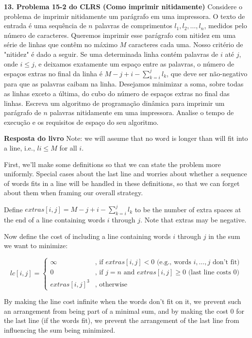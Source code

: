 
\noindent \textbf{13. Problema 15-2 do CLRS (Como imprimir nitidamente)} Considere o problema de imprimir nitidamente um parágrafo em uma impressora. O texto de entrada é uma sequência de $n$ palavras de comprimentos $l_1, l_2, \ldots, l_n$, medidos pelo número de caracteres. Queremos imprimir esse parágrafo com nitidez em uma série de linhas que contêm no máximo $M$ caracteres cada uma. Nosso critério de "nitidez" é dado a seguir. Se uma determinada linha contém palavras de $i$ até $j$, onde $i \leq j$, e deixamos exatamente um espaço entre as palavras, o número de espaços extras no final da linha é $M - j + i - \sum_{k=i}^j l_k$, que deve ser não-negativo para que as palavras caibam na linha. Desejamos minimizar a soma, sobre todas as linhas exceto a última, do cubo do número de espaços extras no final das linhas. Escreva um algoritmo de programação dinâmica para imprimir um parágrafo de $n$ palavras nitidamente em uma impressora. Analise o tempo de execução e os requisitos de espaço do seu algoritmo.

\textbf{Resposta do livro} Note: we will assume that no word is longer than will fit into a line, i.e., $li \leq M$ for all $i$.

First, we'll make some definitions so that we can state the problem more uniformly. Special cases about the last line and worries about whether a sequence of words fits in a line will be handled in these definitions, so that we can forget about them when framing our overall strategy.

Define $extras[i, j] = M - j + i - \sum_{k=i}^j l_k$ to be the number of extra spaces at the end of a line containing words $i$ through $j$. Note that extras may be negative.

Now define the cost of including a line containing words $i$ through $j$ in the sum we want to minimize:

\begin{equation*}
    lc[i, j] =
    \begin{cases}
        \infty & \text{, if } extras[i, j] < 0 \text{ (e.g., words $i, \ldots, j$ don't fit)} \\
        0 & \text{, if } j=n \text{ and } extras[i, j] \geq 0 \text{ (last line costs 0)} \\
        extras[i, j]^3 & \text{, otherwise}
    \end{cases}
\end{equation*}

By making the line cost infinite when the words don't fit on it, we prevent such an arrangement from being part of a minimal sum, and by making the cost 0 for the last line (if the words fit), we prevent the arrangement of the last line from influencing the sum being minimized.

